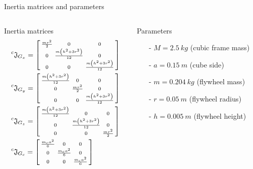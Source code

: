 \begin{frame}{Inertia matrices and parameters}
  \begin{columns}
    \begin{column}{0.55\textwidth}
      \begin{block}{Inertia matrices}
        \vskip-0.1in
      \[
  \begin{split}
    &\prescript{c}{}{\mathfrak{J}}_{G_{x}} = 
    \left[
      \begin{smallmatrix}
        \frac{m r^2}{2} & 0 & 0\\
      0 & \frac{m\left(h^2 + 3 r^2 \right)}{12}  & 0\\
      0 & 0 & \frac{m\left(h^2 + 3 r^2 \right)}{12}
      \end{smallmatrix}
      \right]\\
    &\prescript{c}{}{\mathfrak{J}}_{G_{y}} = 
    \left[
    \begin{smallmatrix}
      \frac{m\left(h^2 + 3 r^2 \right)}{12} & 0 & 0\\
      0 & \frac{m r^2}{2} & 0\\
      0 & 0 & \frac{m\left(h^2 + 3 r^2 \right)}{12}
    \end{smallmatrix}
    \right] \\
    &\prescript{c}{}{\mathfrak{J}}_{G_{z}} = 
    \left[
      \begin{smallmatrix}
        \frac{m\left(h^2 + 3 r^2 \right)}{12} & 0 & 0\\
        0 & \frac{m\left(h^2 + 3 r^2 \right)}{12} & 0\\
      0 & 0 & \frac{m r^2}{2}
      \end{smallmatrix}
      \right]
    \\
    &\prescript{c}{}{\mathfrak{J}}_{G_{c}} = 
    \left[
      \begin{smallmatrix}
      \frac{m_c a^2}{6} & 0 & 0\\
      0 & \frac{m_c a^2}{6} & 0\\
      0 & 0 & \frac{m_c a^2}{6}
    \end{smallmatrix}
    \right]
  \end{split}
  \] 
  \end{block}
  \end{column}
    \begin{column}{0.5\textwidth}
      \begin{block}{Parameters}
        \begin{itemize}
        \item[-] $M = \SI{2.5}{kg}$ (cubic frame mass)
        \item[-] $a = \SI{0.15}{m}$ (cube side)
        \item[-] $m = \SI{0.204}{kg}$ (flywheel mass)
        \item[-] $r = \SI{0.05}{m}$ (flywheel radius)
        \item[-] $h = \SI{0.005}{m}$ (flywheel height)
        \end{itemize}
      \end{block}
    \end{column}
  \end{columns}
\end{frame}


